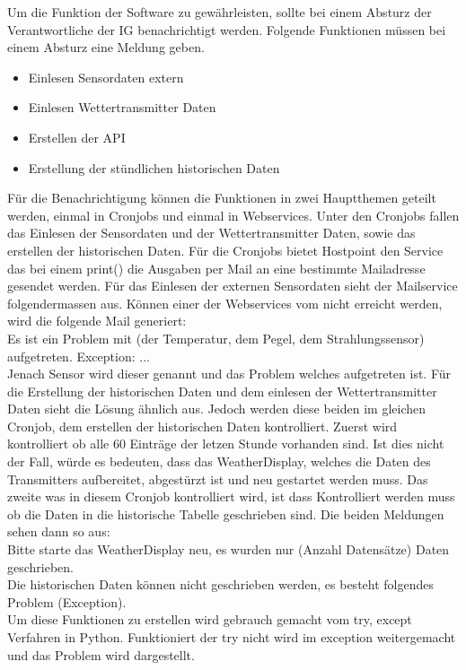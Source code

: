 Um die Funktion der Software zu gewährleisten, sollte bei einem Absturz der Verantwortliche der IG benachrichtigt werden. Folgende Funktionen müssen bei einem Absturz eine Meldung geben.
\begin{itemize}
\item Einlesen Sensordaten extern
\item Einlesen Wettertransmitter Daten
\item Erstellen der API
\item Erstellung der stündlichen historischen Daten
\end{itemize}
Für die Benachrichtigung können die Funktionen in zwei Hauptthemen geteilt werden, einmal in Cronjobs und einmal in Webservices. Unter den Cronjobs fallen das Einlesen der Sensordaten und der Wettertransmitter Daten, sowie das erstellen der historischen Daten. Für die Cronjobs bietet Hostpoint den Service das bei einem print() die Ausgaben per Mail an eine bestimmte Mailadresse gesendet werden. Für das Einlesen der externen Sensordaten sieht der Mailservice folgendermassen aus. Können einer der Webservices vom  nicht erreicht werden, wird die folgende Mail generiert:\\
Es ist ein Problem mit (der Temperatur, dem Pegel, dem Strahlungssensor) aufgetreten. Exception: ...\\
Jenach Sensor wird dieser genannt und das Problem welches aufgetreten ist. Für die Erstellung der historischen Daten und dem einlesen der Wettertransmitter Daten sieht die Lösung ähnlich aus. Jedoch werden diese beiden im gleichen Cronjob, dem erstellen der historischen Daten kontrolliert. Zuerst wird kontrolliert ob alle 60 Einträge der letzen Stunde vorhanden sind. Ist dies nicht der Fall, würde es bedeuten, dass das WeatherDisplay, welches die Daten des Transmitters aufbereitet, abgestürzt ist und neu gestartet werden muss. Das zweite was in diesem Cronjob kontrolliert wird, ist dass Kontrolliert werden muss ob die Daten in die historische Tabelle geschrieben sind. Die beiden Meldungen sehen dann so aus:\\
Bitte starte das WeatherDisplay neu, es wurden nur (Anzahl Datensätze) Daten geschrieben.\\
Die historischen Daten können nicht geschrieben werden, es besteht folgendes Problem (Exception).\\

Um diese Funktionen zu erstellen wird gebrauch gemacht vom try, except Verfahren in Python. Funktioniert der try nicht wird im exception weitergemacht und das Problem wird dargestellt. 
